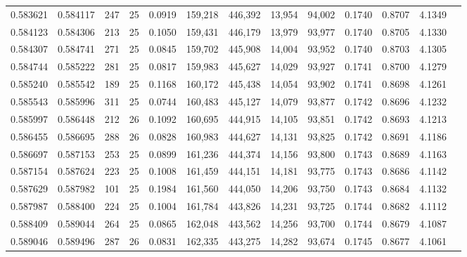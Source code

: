 \begin{tabular}{rrrrrrrrrrrrr}
0.583621 & 0.584117 &   247 &  25 &                                     0.0919 & 159,218 & 446,392 &  13,954 &  94,002 & 0.1740 & 0.8707 & 4.1349 \\
0.584123 & 0.584306 &   213 &  25 &                                     0.1050 & 159,431 & 446,179 &  13,979 &  93,977 & 0.1740 & 0.8705 & 4.1330 \\
0.584307 & 0.584741 &   271 &  25 &                                     0.0845 & 159,702 & 445,908 &  14,004 &  93,952 & 0.1740 & 0.8703 & 4.1305 \\
0.584744 & 0.585222 &   281 &  25 &                                     0.0817 & 159,983 & 445,627 &  14,029 &  93,927 & 0.1741 & 0.8700 & 4.1279 \\
0.585240 & 0.585542 &   189 &  25 &                                     0.1168 & 160,172 & 445,438 &  14,054 &  93,902 & 0.1741 & 0.8698 & 4.1261 \\
0.585543 & 0.585996 &   311 &  25 &                                     0.0744 & 160,483 & 445,127 &  14,079 &  93,877 & 0.1742 & 0.8696 & 4.1232 \\
0.585997 & 0.586448 &   212 &  26 &                                     0.1092 & 160,695 & 444,915 &  14,105 &  93,851 & 0.1742 & 0.8693 & 4.1213 \\
0.586455 & 0.586695 &   288 &  26 &                                     0.0828 & 160,983 & 444,627 &  14,131 &  93,825 & 0.1742 & 0.8691 & 4.1186 \\
0.586697 & 0.587153 &   253 &  25 &                                     0.0899 & 161,236 & 444,374 &  14,156 &  93,800 & 0.1743 & 0.8689 & 4.1163 \\
0.587154 & 0.587624 &   223 &  25 &                                     0.1008 & 161,459 & 444,151 &  14,181 &  93,775 & 0.1743 & 0.8686 & 4.1142 \\
0.587629 & 0.587982 &   101 &  25 &                                     0.1984 & 161,560 & 444,050 &  14,206 &  93,750 & 0.1743 & 0.8684 & 4.1132 \\
0.587987 & 0.588400 &   224 &  25 &                                     0.1004 & 161,784 & 443,826 &  14,231 &  93,725 & 0.1744 & 0.8682 & 4.1112 \\
0.588409 & 0.589044 &   264 &  25 &                                     0.0865 & 162,048 & 443,562 &  14,256 &  93,700 & 0.1744 & 0.8679 & 4.1087 \\
0.589046 & 0.589496 &   287 &  26 &                                     0.0831 & 162,335 & 443,275 &  14,282 &  93,674 & 0.1745 & 0.8677 & 4.1061 \\

\end{tabular}
